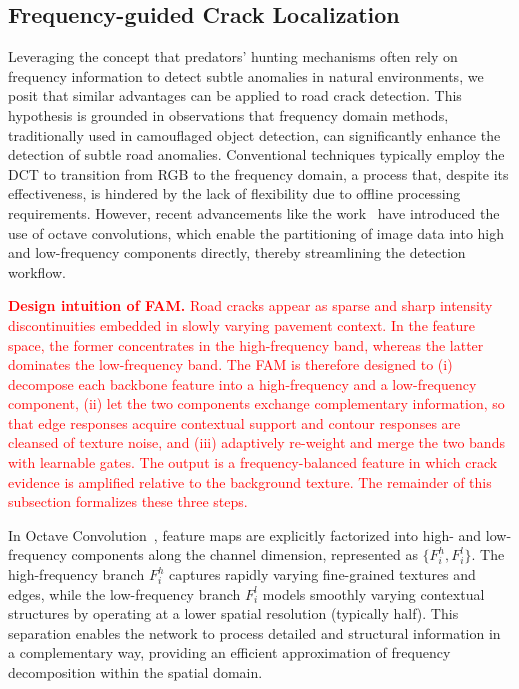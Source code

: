 \documentclass[journal]{IEEEtran}
\begin{document}
\subsection{{Frequency-guided Crack Localization}} \label{sec:Frequency-guided-Coarse-Positioning}
Leveraging the concept that predators' hunting mechanisms often rely on frequency information to detect subtle anomalies in natural environments, we posit that similar advantages can be applied to road crack detection. This hypothesis is grounded in observations that frequency domain methods, traditionally used in camouflaged object detection, can significantly enhance the detection of subtle road anomalies. Conventional techniques typically employ the DCT to transition from RGB to the frequency domain, a process that, despite its effectiveness, is hindered by the lack of flexibility due to offline processing requirements. However, recent advancements like the work~\cite{DBLP:conf/iccv/Chen0XYKRYF19} have introduced the use of octave convolutions, which enable the partitioning of image data into high and low-frequency components directly, thereby streamlining the detection workflow. 



\textcolor{red}{\textbf{Design intuition of FAM.} Road cracks appear as sparse and sharp intensity discontinuities embedded in slowly varying pavement context. In the feature space, the former concentrates in the high-frequency band, whereas the latter dominates the low-frequency band. The FAM is therefore designed to (i) decompose each backbone feature into a high-frequency and a low-frequency component, (ii) let the two components exchange complementary information, so that edge responses acquire contextual support and contour responses are cleansed of texture noise, and (iii) adaptively re-weight and merge the two bands with learnable gates. The output is a frequency-balanced feature in which crack evidence is amplified relative to the background texture. The remainder of this subsection formalizes these three steps.}

In Octave Convolution~\cite{DBLP:conf/iccv/Chen0XYKRYF19},
feature maps are explicitly factorized into high- and low-frequency components along the channel dimension,
represented as $\{F_i^h, F_i^l\}$. 
The high-frequency branch $F_i^h$ captures rapidly varying fine-grained textures and edges, 
while the low-frequency branch $F_i^l$ models smoothly varying contextual structures by operating at a lower spatial resolution (typically half). 
This separation enables the network to process detailed and structural information in a complementary way, 
providing an efficient approximation of frequency decomposition within the spatial domain.
\end{document}
